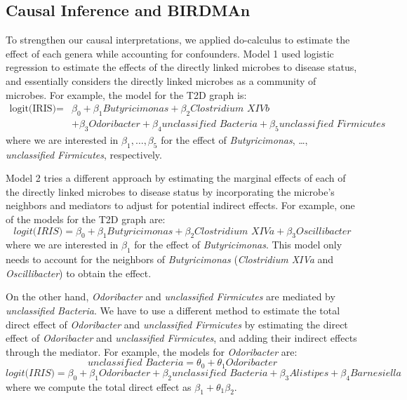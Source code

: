 \documentclass[12pt,letterpaper]{article}
\begin{document}
\subsection{Causal Inference and BIRDMAn}

To strengthen our causal interpretations, we applied do-calculus to estimate the effect of each genera while accounting for confounders. Model 1 used logistic regression to estimate the effects of the directly linked microbes to disease status, and essentially considers the directly linked microbes as a community of microbes. For example, the model for the T2D graph is: \begin{align*}\text{logit(IRIS)} = &\beta_0 + \beta_1 \textit{Butyricimonas} + \beta_2 \textit{Clostridium XIVb}\\ &+ \beta_3 \textit{Odoribacter} + \beta_4 \textit{unclassified Bacteria} + \beta_5 \textit{unclassified Firmicutes}\end{align*}
where we are interested in $\beta_1, \dots, \beta_5$ for the effect of \textit{Butyricimonas}, …, \textit{unclassified Firmicutes}, respectively.

Model 2 tries a different approach by estimating the marginal effects of each of the directly linked microbes to disease status by incorporating the microbe’s neighbors and mediators to adjust for potential indirect effects. For example, one of the models for the T2D graph are: \[\textit{logit(IRIS)} = \beta_0 + \beta_1 \textit{Butyricimonas} + \beta_2 \textit{Clostridium XIVa} + \beta_3 \textit{Oscillibacter}\]
where we are interested in $\beta_1$ for the effect of \textit{Butyricimonas}. This model only needs to account for the neighbors of \textit{Butyricimonas} (\textit{Clostridium XIVa} and \textit{Oscillibacter}) to obtain the effect. 

On the other hand, \textit{Odoribacter} and \textit{unclassified Firmicutes} are mediated by \textit{unclassified Bacteria}. We have to use a different method to estimate the total direct effect of \textit{Odoribacter} and \textit{unclassified Firmicutes} by estimating the direct effect of \textit{Odoribacter} and \textit{unclassified Firmicutes}, and adding their indirect effects through the mediator. For example, the models for \textit{Odoribacter} are:
\[\textit{unclassified Bacteria} = \theta_0 + \theta_1 \textit{Odoribacter}\]
\[\textit{logit(IRIS)} = \beta_0 + \beta_1 \textit{Odoribacter} + \beta_2 \textit{unclassified Bacteria} + \beta_3 \textit{Alistipes} + \beta_4 \textit{Barnesiella}\]
where we compute the total direct effect as $\beta_1 + \theta_1\beta_2$. 
\end{document}
